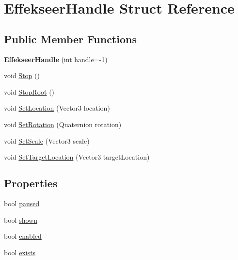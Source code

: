 \hypertarget{struct_effekseer_handle}{}\section{Effekseer\+Handle Struct Reference}
\label{struct_effekseer_handle}
\subsection*{Public Member Functions}
\begin{DoxyCompactItemize}
\item 
\mbox{\label{struct_effekseer_handle_ace59b89b09c1b0aefa13775e857b33dc}} 
{\bfseries Effekseer\+Handle} (int handle=-\/1)
\item 
void \hyperlink{struct_effekseer_handle_add31723e9d75fad60015c48dfe1bf785}{Stop} ()
\item 
void \hyperlink{struct_effekseer_handle_ae16184a6f1770d63edf941941b8ad063}{Stop\+Root} ()
\item 
void \hyperlink{struct_effekseer_handle_a65d631a161e475acac133b6db28d0070}{Set\+Location} (Vector3 location)
\item 
void \hyperlink{struct_effekseer_handle_a54be425dc9d059e66fe00799f34e25cf}{Set\+Rotation} (Quaternion rotation)
\item 
void \hyperlink{struct_effekseer_handle_a858d40ff7676ec5c2ae062596f52795b}{Set\+Scale} (Vector3 scale)
\item 
void \hyperlink{struct_effekseer_handle_aa13ed72d63bdcf16ab9683261b92c855}{Set\+Target\+Location} (Vector3 target\+Location)
\end{DoxyCompactItemize}
\subsection*{Properties}
\begin{DoxyCompactItemize}
\item 
bool \hyperlink{struct_effekseer_handle_a3ba9bf72308429369214fd10ebb86ca6}{paused}
\item 
bool \hyperlink{struct_effekseer_handle_a96d0ebfe4cab721aaea0992b1750ae43}{shown}
\item 
bool \hyperlink{struct_effekseer_handle_a5b5edae1257e381de00a7bf9f546b37c}{enabled}
\item 
bool \hyperlink{struct_effekseer_handle_ac1d253853e6471ce1e3c951491803c27}{exists}
\end{DoxyCompactItemize}


